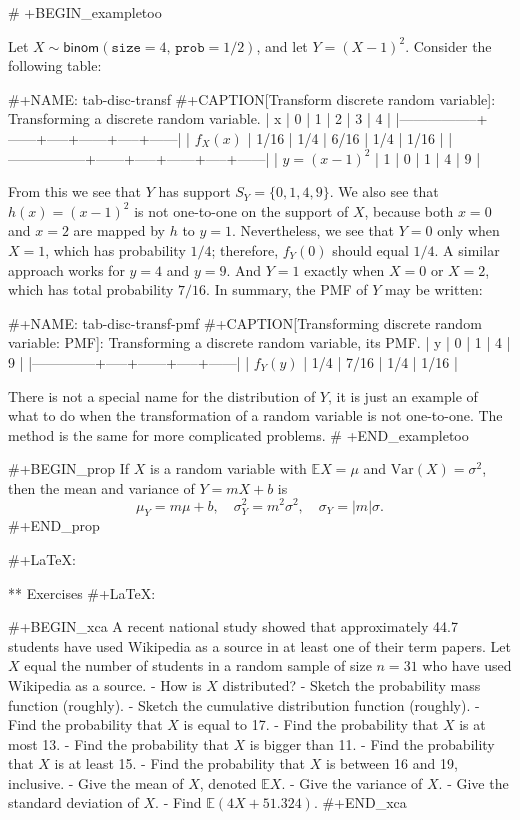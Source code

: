 {# +BEGIN_exampletoo

Let \(X\sim\mathsf{binom}(\mathtt{size}=4,\,\mathtt{prob}=1/2)\), and let \(Y=(X-1)^{2}\). Consider the following table:

#+NAME: tab-disc-transf
#+CAPTION[Transform discrete random variable]: Transforming a discrete random variable.
| x               |    0 |   1 |    2 |   3 |    4 |
|-----------------+------+-----+------+-----+------|
| \(f_{X}(x)\)    | 1/16 | 1/4 | 6/16 | 1/4 | 1/16 |
|-----------------+------+-----+------+-----+------|
| \(y=(x-1)^{2}\) |    1 |   0 |    1 |   4 |    9 |

From this we see that \(Y\) has support \(S_{Y}=\{0,1,4,9\}\). We also
see that \(h(x)=(x-1)^{2}\) is not one-to-one on the support of \(X\),
because both \(x=0\) and \(x=2\) are mapped by \(h\) to
\(y=1\). Nevertheless, we see that \(Y=0\) only when \(X=1\), which
has probability \(1/4\); therefore, \(f_{Y}(0)\) should equal
\(1/4\). A similar approach works for \(y=4\) and \(y=9\). And \(Y=1\)
exactly when \(X=0\) or \(X=2\), which has total probability
\(7/16\). In summary, the PMF of \(Y\) may be written:

#+NAME: tab-disc-transf-pmf
#+CAPTION[Transforming discrete random variable: PMF]: Transforming a discrete random variable, its PMF.
| y            |   0 |    1 |   4 |    9 |
|--------------+-----+------+-----+------|
| \(f_{Y}(y)\) | 1/4 | 7/16 | 1/4 | 1/16 |

There is not a special name for the distribution of \(Y\), it is just
an example of what to do when the transformation of a random variable
is not one-to-one. The method is the same for more complicated
problems.
# +END_exampletoo


#+BEGIN_prop
If \(X\) is a random variable with \(\mathbb{E} X=\mu\) and \(\mbox{Var}(X)=\sigma^{2}\), then the mean and variance of \(Y=mX+b\) is
\begin{equation}
\mu_{Y}=m\mu+b,\quad \sigma_{Y}^{2}=m^{2}\sigma^{2},\quad \sigma_{Y}=|m|\sigma.
\end{equation}
#+END_prop

#+LaTeX: \newpage{}

** Exercises
#+LaTeX: \setcounter{thm}{0}

#+BEGIN_xca
A recent national study showed that approximately 44.7%
students have used Wikipedia as a source in at least one of their term
papers. Let \(X\) equal the number of students in a random sample of
size \(n=31\) who have used Wikipedia as a source.
- How is \(X\) distributed? 
- Sketch the probability mass function (roughly).
- Sketch the cumulative distribution function (roughly).
- Find the probability that \(X\) is equal to 17.
- Find the probability that \(X\) is at most 13.
- Find the probability that \(X\) is bigger than 11.
- Find the probability that \(X\) is at least 15.
- Find the probability that \(X\) is between 16 and 19, inclusive.
- Give the mean of \(X\), denoted \(\mathbb{E} X\).
- Give the variance of \(X\).
- Give the standard deviation of \(X\).
- Find \(\mathbb{E}(4X + 51.324)\).
#+END_xca

}
